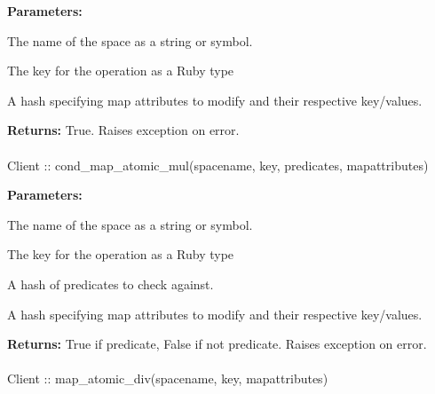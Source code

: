 \noindent\textbf{Parameters:}
\begin{description}[labelindent=\widthof{{\code{mapattributes}}},leftmargin=*,noitemsep,nolistsep,align=right]
\item[\code{spacename}] The name of the space as a string or symbol.
\item[\code{key}] The key for the operation as a Ruby type
\item[\code{mapattributes}] A hash specifying map attributes to modify and their respective key/values.
\end{description}

\noindent\textbf{Returns:}
True.  Raises exception on error.

\paragraph{}
\label{api:ruby:cond_map_atomic_mul}
\begin{ccode}
Client :: cond_map_atomic_mul(spacename, key, predicates, mapattributes)
\end{ccode}
\funcdesc 

\noindent\textbf{Parameters:}
\begin{description}[labelindent=\widthof{{\code{mapattributes}}},leftmargin=*,noitemsep,nolistsep,align=right]
\item[\code{spacename}] The name of the space as a string or symbol.
\item[\code{key}] The key for the operation as a Ruby type
\item[\code{predicates}] A hash of predicates to check against.
\item[\code{mapattributes}] A hash specifying map attributes to modify and their respective key/values.
\end{description}

\noindent\textbf{Returns:}
True if predicate, False if not predicate.  Raises exception on error.

\paragraph{}
\label{api:ruby:map_atomic_div}
\begin{ccode}
Client :: map_atomic_div(spacename, key, mapattributes)
\end{ccode}
\funcdesc 

